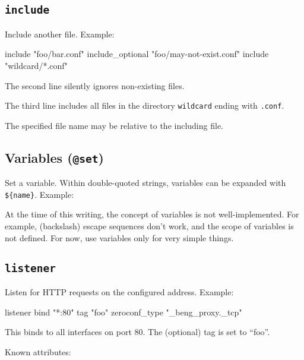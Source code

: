\documentclass[a4paper,12pt]{article}
\begin{document}
\subsection{\texttt{include}}

Include another file.  Example:

\begin{verbatim*}
include "foo/bar.conf"
include_optional "foo/may-not-exist.conf"
include "wildcard/*.conf"
\end{verbatim*}

The second line silently ignores non-existing files.

The third line includes all files in the directory \texttt{wildcard}
ending with \texttt{.conf}.

The specified file name may be relative to the including file.

\subsection{Variables (\texttt{@set})}

Set a variable.  Within double-quoted strings, variables can be
expanded with \verb|${name}|.  Example:


At the time of this writing, the concept of variables is not
well-implemented.  For example, (backslash) escape sequences don't
work, and the scope of variables is not defined.  For now, use
variables only for very simple things.

\subsection{\texttt{listener}}

Listen for HTTP requests on the configured address.  Example:

\begin{verbatim*}
listener {
   bind "*:80"
   tag "foo"
   zeroconf_type "_beng_proxy._tcp"
}
\end{verbatim*}

This binds to all interfaces on port 80.  The (optional) tag is set to
``foo''.

Known attributes:
\end{document}
